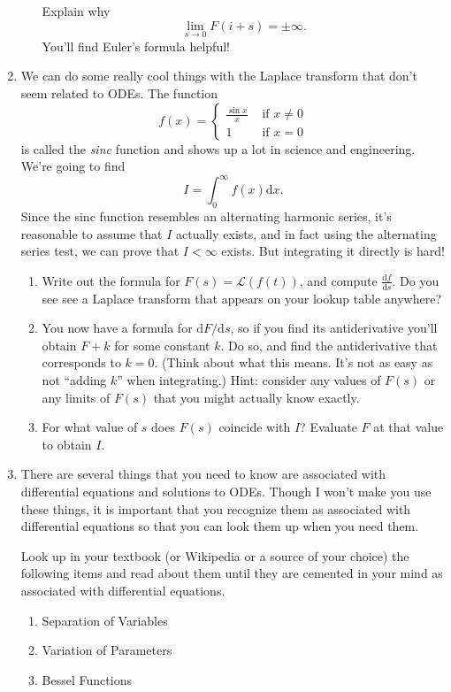 \documentclass[letter]{article}
\renewcommand{\d}{\mathrm{d}}
\begin{document}
\begin{enumerate}
\begin{enumerate}
					Explain why 
					\[
						\lim_{s\to 0} F(i+s) = \pm\infty.
					\]
					You'll find Euler's formula helpful!
			\end{enumerate}
		\item We can do some really cool things with the Laplace transform that don't seem related to ODEs.
			The function 
			\[
			f(x) = \begin{cases}\frac{\sin x}{x}&\text{ if }x\neq 0\\1&\text{ if }x=0\end{cases}
			\]
			is called the \emph{sinc} function and shows up a lot in science and
			engineering.  We're going to find
			\[
				I = \int_0^\infty f(x)\d x.
			\]
			Since the sinc function resembles an alternating harmonic series, it's reasonable to
			assume that $I$ actually exists, and in fact using the alternating series
			test, we can prove that $I<\infty$ exists.  But integrating it directly is hard!
			\begin{enumerate}
				\item Write out the formula for $F(s)=\mathscr L(f(t))$, and compute 
					$\frac{\d f}{\d s}$.  Do you see see a Laplace transform
					that appears on your lookup table anywhere?
				\item You now have a formula for $\d F/\d s$, so if you find its antiderivative
					you'll obtain $F+k$ for some constant $k$.  Do so, and find
					the antiderivative that corresponds to $k=0$.  (Think about what this means.
					It's not as easy as not ``adding $k$'' when integrating.)  Hint: consider
					any values of $F(s)$ or any limits of $F(s)$ that you might actually know
					exactly.
				\item For what value of $s$ does $F(s)$ coincide with $I$?  Evaluate $F$ at
					that value to obtain $I$.
			\end{enumerate}

		\item There are several things that you need to know are associated
			with differential equations and solutions to ODEs.  Though I won't
			make you use these things, it is important that you recognize them as
			associated with differential equations so that you can look them up when
			you need them.

			Look up in your textbook (or Wikipedia or a source of your choice) the following
			items and read about them until they are cemented in your mind as associated
			with differential equations.
			\begin{enumerate}
				\item Separation of Variables
				\item Variation of Parameters
				\item Bessel Functions
			\end{enumerate}

	\end{enumerate}
\end{document}
